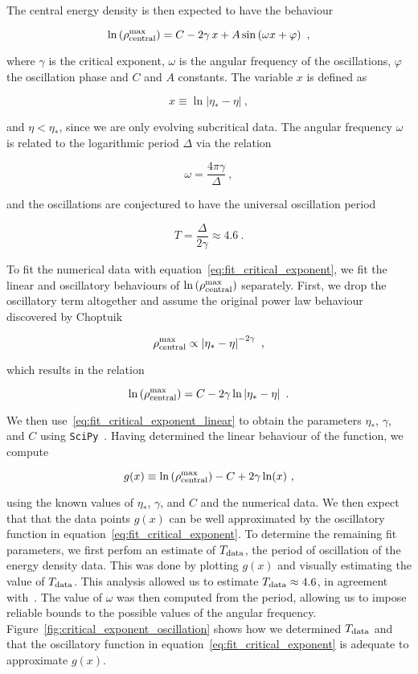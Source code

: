 \documentclass[a4paper,11pt]{article}
\newcommand{\g}{\gamma}
\newcommand{\D}{\Delta}
\newcommand{\lrpar}[1]{\left( #1 \right)}
\newcommand{\abs}[1]{\left| #1 \right|}
\newcommand{\n}{\noindent}
\newcommand{\eq}[1]{
  \begin{equation}
    #1
  \end{equation}
}
\begin{document}
The central energy density is then expected to have the behaviour

\eq{
\ln\lrpar{\rho^{\rm max}_{\rm central}} = C - 2\g\,x + A\sin\lrpar{\omega x + \varphi}\ ,\label{eq:fit_critical_exponent}
}

\n where $\g$ is the critical exponent, $\omega$ is the angular frequency of the oscillations, $\varphi$ the oscillation phase and $C$ and $A$ constants. The variable $x$ is defined as

\eq{
  x \equiv \ln\abs{\eta_{*}-\eta}\ ,
}

\n and $\eta<\eta_{*}$, since we are only evolving subcritical data. The angular frequency $\omega$ is related to the logarithmic period $\D$ via the relation

\eq{
  \omega = \frac{4\pi\g}{\D}\ ,\label{eq:universal_period_ito_omega}
}

\n and the oscillations are conjectured to have the universal oscillation period~\cite{PhysRevD.55.R440}

\eq{
  T = \frac{\D}{2\g} \approx 4.6\ .
}

To fit the numerical data with equation~\eqref{eq:fit_critical_exponent}, we fit the linear and oscillatory behaviours of $\ln\lrpar{\rho^{\rm max}_{\rm central}}$ separately. First, we drop the oscillatory term altogether and assume the original power law behaviour discovered by Choptuik

\eq{
  \rho^{\rm max}_{\rm central} \propto \abs{\eta_{*}-\eta}^{-2\g}\ ,
}

\n which results in the relation


\eq{
  \ln\lrpar{\rho^{\rm max}_{\rm central}} = C - 2\g\ln\abs{\eta_{*}-\eta}\ .\label{eq:fit_critical_exponent_linear}
}

\n We then use~\eqref{eq:fit_critical_exponent_linear} to obtain the parameters $\eta_{*}$, $\g$, and $C$ using {\tt SciPy}~\cite{2020SciPy-NMeth}. Having determined the linear behaviour of the function, we compute

\eq{
g(x) \equiv \ln\lrpar{\rho^{\rm max}_{\rm central}} - C + 2\g\ln(x)\ ,
}

\n using the known values of $\eta_{*}$, $\g$, and $C$ and the numerical data. We then expect that that the data points $g(x)$ can be well approximated by the oscillatory function in equation~\eqref{eq:fit_critical_exponent}. To determine the remaining fit parameters, we first perfom an estimate of $T_{\rm data}$, the period of oscillation of the energy density data. This was done by plotting $g(x)$ and visually estimating the value of $T_{\rm data}$. This analysis allowed us to estimate $T_{\rm data}\approx4.6$, in agreement with~\cite{PhysRevD.55.R440}. The value of $\omega$ was then computed from the period, allowing us to impose reliable bounds to the possible values of the angular frequency. Figure~\ref{fig:critical_exponent_oscillation} shows how we determined $T_{\rm data}$ and that the oscillatory function in equation~\eqref{eq:fit_critical_exponent} is adequate to approximate $g(x)$.
\end{document}
